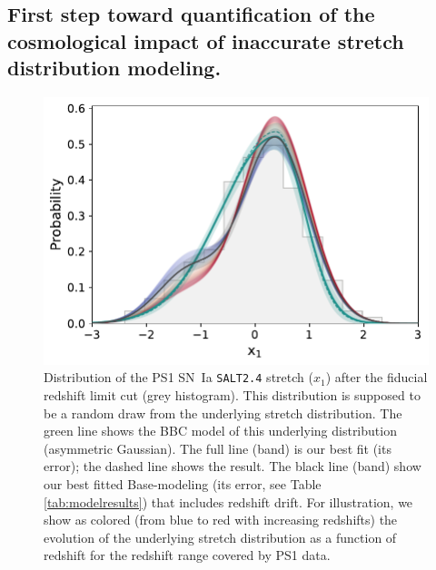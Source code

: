 \documentclass[]{aa} %
\begin{document}
\subsection{First step toward quantification of the cosmological impact of
inaccurate stretch distribution modeling.}

\begin{figure}
    \centering
    \includegraphics[width=\linewidth]{Article_figures/bbc_comp_PS1_hist-nr.pdf}
    \caption{Distribution of the PS1 SN~Ia \textsc{\texttt{SALT2.4}} stretch
        ($x_1$) after the fiducial redshift limit cut (grey histogram). This
        distribution is supposed to be a random draw from the underlying stretch
        distribution. The green line shows the BBC model of this underlying
        distribution (asymmetric Gaussian). The full line (band) is our best fit
        (its error); the dashed line shows the \cite{scolnic2018a} result. The
        black line (band) show our best fitted Base-modeling (its error, see
        Table \ref{tab:modelresults}) that includes redshift drift. For
    illustration, we show as colored (from blue to red with increasing
redshifts) the evolution of the underlying stretch distribution as a function of
redshift for the redshift range covered by PS1 data.}
    \label{fig:bbc_pdf_ps1}
\end{figure}
\end{document}
